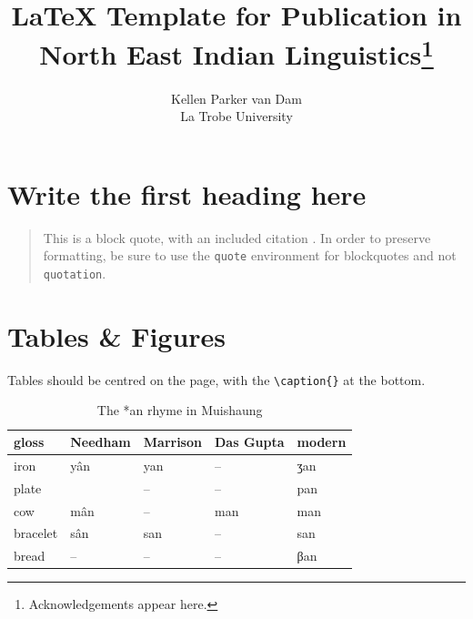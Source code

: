 


\title{LaTeX Template for Publication in North East Indian Linguistics\footnote{Acknowledgements appear here.}}

\author{Kellen Parker van Dam\\La Trobe University}

\maketitle


\section{Write the first heading here}

\lipsum[1]

\begin{quote}
	This is a block quote, with an included citation \autocite{morey2018verbstemalternation}. In order to preserve formatting, be sure to use the \texttt{quote} environment for blockquotes and not \texttt{quotation}.
\end{quote}

\lipsum[5]

\section{Tables \& Figures}

\lipsum[6]

Tables should be centred on the page, with the \texttt{\textbackslash caption\{\}} at the bottom.

\begin{table}[htpb!]
	\centering
	\begin{tabular}{@{}lllll@{}}
	\toprule
	gloss & Needham & Marrison & Das Gupta & modern \\ \midrule
	iron & yân & yan & -- & ʒan \\
	plate &  & -- & -- & pan \\
	cow & mân & -- & man & man \\
	bracelet & sân & san & -- & san \\
	bread & -- & -- & -- & βan \\ \bottomrule
	\end{tabular}
	\caption{The *an rhyme in Muishaung}
	\label{tab:an}
\end{table}

